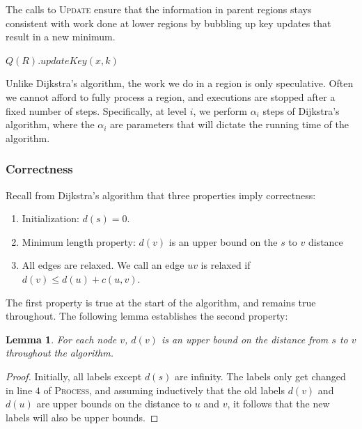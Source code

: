 \documentclass[11pt]{article}
\newtheorem{lemma}[theorem]{Lemma}
\begin{document}
The calls to \textsc{Update} ensure that the information in parent regions stays consistent with work done at lower regions by bubbling up key updates that result in a new minimum.

\begin{algorithm}[!h]
  \label{alg:update}
  \begin{algorithmic}[1]
      \State $Q(R).updateKey(x,k)$
        \State {}
      \EndIf
    \EndProcedure
  \end{algorithmic}
\end{algorithm}

Unlike Dijkstra's algorithm, the work we do in a region is only speculative. Often we cannot afford to fully process a region, and executions are stopped after a fixed number of steps. Specifically, at level $i$, we perform $\alpha_i$ steps of Dijkstra's algorithm, where the $\alpha_i$ are parameters that will dictate the running time of the algorithm.

\subsubsection{Correctness}
\label{sec:correctness}

Recall from Dijkstra's algorithm that three properties imply correctness:
\begin{enumerate}
\item Initialization: $d(s) = 0$.
\item Minimum length property: $d(v)$ is an upper bound on the $s$ to $v$ distance
\item All edges are relaxed. We call an edge $uv$ is relaxed if $d(v) \leq d(u) + c(u,v)$.
\end{enumerate}

The first property is true at the start of the algorithm, and remains true throughout. The following lemma establishes the second property:\\

\begin{lemma}
  For each node $v$, $d(v)$ is an upper bound on the distance from $s$ to $v$ throughout the algorithm.
\end{lemma}

\begin{proof}
  Initially, all labels except $d(s)$ are infinity. The labels only get changed in line $4$ of \textsc{Process}, and assuming inductively that the old labels $d(v)$ and $d(u)$ are upper bounds on the distance to $u$ and $v$, it follows that the new labels will also be upper bounds.
\end{proof}
\end{document}

